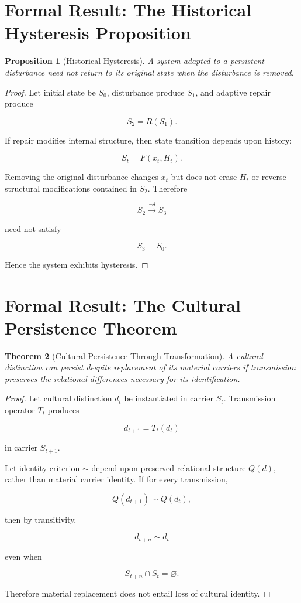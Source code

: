 \documentclass[11pt,oneside]{book}
\newtheorem{theorem}{Theorem}[chapter]
\newtheorem{proposition}[theorem]{Proposition}
\theoremstyle{definition}
\theoremstyle{remark}
\begin{document}
\section{Formal Result: The Historical Hysteresis Proposition}

\begin{proposition}[Historical Hysteresis]
A system adapted to a persistent disturbance need not return to its original state when the disturbance is removed.
\end{proposition}

\begin{proof}
Let initial state be \(S_0\), disturbance produce \(S_1\), and adaptive repair produce

\[
S_2=R(S_1).
\]

If repair modifies internal structure, then state transition depends upon history:

\[
S_t=F(x_t,H_t).
\]

Removing the original disturbance changes \(x_t\) but does not erase \(H_t\) or reverse structural modifications contained in \(S_2\). Therefore

\[
S_2\xrightarrow{\neg\delta}S_3
\]

need not satisfy

\[
S_3=S_0.
\]

Hence the system exhibits hysteresis.
\end{proof}

\section{Formal Result: The Cultural Persistence Theorem}

\begin{theorem}[Cultural Persistence Through Transformation]
A cultural distinction can persist despite replacement of its material carriers if transmission preserves the relational differences necessary for its identification.
\end{theorem}

\begin{proof}
Let cultural distinction \(d_t\) be instantiated in carrier \(S_t\). Transmission operator \(T_t\) produces

\[
d_{t+1}=T_t(d_t)
\]

in carrier \(S_{t+1}\).

Let identity criterion \(\sim\) depend upon preserved relational structure \(Q(d)\), rather than material carrier identity. If for every transmission,

\[
Q(d_{t+1})\sim Q(d_t),
\]

then by transitivity,

\[
d_{t+n}\sim d_t
\]

even when

\[
S_{t+n}\cap S_t=\varnothing.
\]

Therefore material replacement does not entail loss of cultural identity.
\end{proof}
\end{document}
